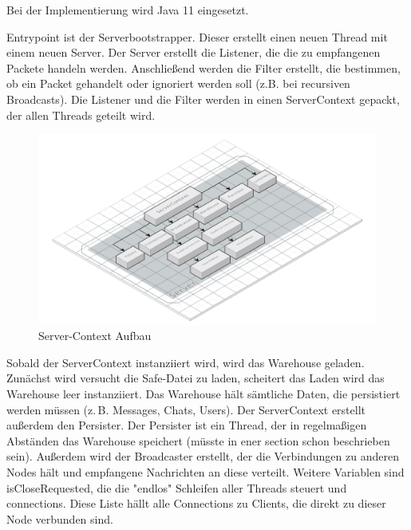 
Bei der Implementierung wird Java 11 eingesetzt.




    Entrypoint ist der Serverbootstrapper. Dieser erstellt einen neuen Thread mit einem neuen Server. Der Server erstellt die Listener, die die zu empfangenen Packete handeln werden. Anschließend werden die Filter erstellt, die bestimmen, ob ein Packet gehandelt oder ignoriert werden soll (z.B. bei recursiven Broadcasts). Die Listener und die Filter werden in einen ServerContext gepackt, der allen Threads geteilt wird.

    \begin{figure}[h]
        \centering
        \includegraphics[width=\textwidth]{VS-Server-Context.png}
        
        \caption{Server-Context Aufbau}
        \label{}
    \end{figure}

    Sobald der ServerContext instanziiert wird, wird das Warehouse geladen. Zunächst wird versucht die Safe-Datei zu laden, scheitert das Laden wird das Warehouse leer instanziiert. Das Warehouse hält sämtliche Daten, die persistiert werden müssen (z.\,B. Messages, Chats, Users). Der ServerContext erstellt außerdem den Persister. Der Persister ist ein Thread, der in regelmaßigen Abständen das Warehouse speichert (müsste in ener section schon beschrieben sein). Außerdem wird der Broadcaster erstellt, der die Verbindungen zu anderen Nodes hält und empfangene Nachrichten an diese verteilt.
    Weitere Variablen sind isCloseRequested, die die "endlos" Schleifen aller Threads steuert und connections. Diese Liste hällt alle Connections zu Clients, die direkt zu dieser Node verbunden sind.

